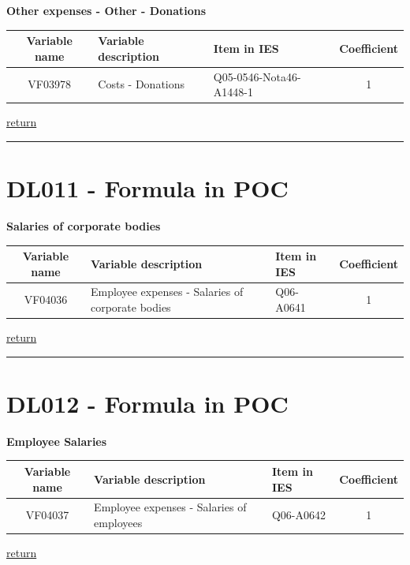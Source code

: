 \documentclass[]{book}
\begin{document}
\textbf{Other expenses - Other - Donations}

\begin{longtable}[]{@{}cllc@{}}
\toprule
Variable name & Variable description & Item in IES & Coefficient\tabularnewline
\midrule
\endhead
VF03978 & Costs - Donations & Q05-0546-Nota46-A1448-1 & 1\tabularnewline
\bottomrule
\end{longtable}

\protect\hyperlink{b3.-profit-and-loss-statement-variables}{return}

\begin{center}\rule{0.5\linewidth}{\linethickness}\end{center}

\hypertarget{dl011---formula-in-poc}{%
\section{DL011 - Formula in POC}\label{dl011---formula-in-poc}}

\textbf{Salaries of corporate bodies}

\begin{longtable}[]{@{}cllc@{}}
\toprule
Variable name & Variable description & Item in IES & Coefficient\tabularnewline
\midrule
\endhead
VF04036 & Employee expenses - Salaries of corporate bodies & Q06-A0641 & 1\tabularnewline
\bottomrule
\end{longtable}

\protect\hyperlink{b3.-profit-and-loss-statement-variables}{return}

\begin{center}\rule{0.5\linewidth}{\linethickness}\end{center}

\hypertarget{dl012---formula-in-poc}{%
\section{DL012 - Formula in POC}\label{dl012---formula-in-poc}}

\textbf{Employee Salaries}

\begin{longtable}[]{@{}cllc@{}}
\toprule
Variable name & Variable description & Item in IES & Coefficient\tabularnewline
\midrule
\endhead
VF04037 & Employee expenses - Salaries of employees & Q06-A0642 & 1\tabularnewline
\bottomrule
\end{longtable}

\protect\hyperlink{b3.-profit-and-loss-statement-variables}{return}
\end{document}
